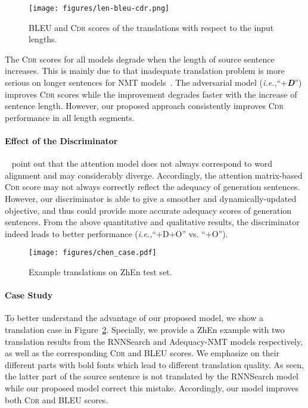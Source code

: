 \documentclass[letterpaper]{article} \usepackage{aaai19}  \usepackage{times}  \usepackage{helvet}  \usepackage{courier}  \usepackage{url}  \usepackage{graphicx}  \frenchspacing  \setlength{\pdfpagewidth}{8.5in}  \setlength{\pdfpageheight}{11in}  \usepackage{amsmath}
\begin{document}
\begin{figure}[t]
\centering
    \texttt{[image: figures/len-bleu-cdr.png]}
    \caption{BLEU and \textsc{Cdr} scores of the translations with respect to the input lengths.}
    \label{figure-sentence-len}
\end{figure}

The \textsc{Cdr} scores for all models degrade when the length of source sentence increases. This is mainly due to that inadequate translation problem is more serious on longer sentences for NMT models~\cite{tu2016modeling}. The adversarial model (\emph{i.e.,}\xspace ``+{\bf \em D}'') improves \textsc{Cdr} scores while the improvement degrades faster with the increase of sentence length. However, our proposed approach consistently improves \textsc{Cdr} performance in all length segments.


\paragraph{Effect of the Discriminator}
\citeauthor{koehn2017six}~ point out that the attention model does not always correspond to word alignment and may considerably diverge. Accordingly, the attention matrix-based \textsc{Cdr} score  may not always correctly reflect the adequacy of generation sentences. However, our discriminator is able to give a smoother and dynamically-updated objective, and thus could provide more accurate adequacy scores of generation sentences. From the above quantitative and qualitative results, the discriminator indeed leads to better performance (\emph{i.e.,}\xspace ``+D+O'' vs. ``+O'').


\begin{figure}[t]
    \centering
    \texttt{[image: figures/chen\_case.pdf]}
    \caption{Example translations on ZhEn test set.}
    \label{tab:case}
\end{figure}


\paragraph{Case Study}
To better understand the advantage of our proposed model, we show a translation case in Figure~\ref{tab:case}. Specially, we provide a ZhEn example with two translation results from the RNNSearch and Adequacy-NMT models respectively, as well as the corresponding \textsc{Cdr} and BLEU scores. We emphasize on their different parts with bold fonts which lead to different translation quality.
As seen, the latter part of the source sentence is not translated by the RNNSearch model while our proposed model correct this mistake. Accordingly, our model improves both \textsc{Cdr} and BLEU scores.
\end{document}
